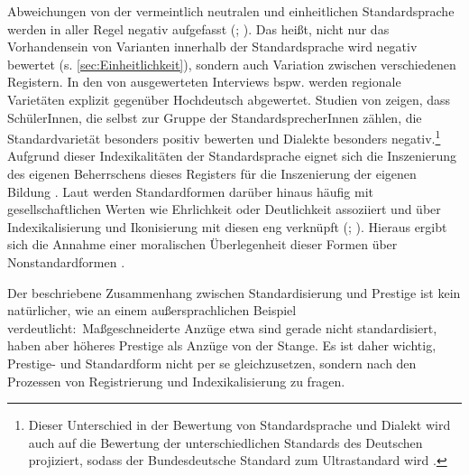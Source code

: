 Abweichungen von der vermeintlich neutralen und einheitlichen Standardsprache werden in aller Regel negativ aufgefasst (\citealp[s.][522]{Harnisch.2005}; \citealp[136]{Silverstein.2017}).
Das heißt, nicht nur das Vorhandensein von Varianten innerhalb der Standardsprache wird negativ bewertet (s. \autoref{sec:Einheitlichkeit}), sondern auch Variation zwischen verschiedenen Registern.  
In den von \citet[]{Beuge2017} ausgewerteten Interviews bspw. werden regionale Varietäten explizit gegenüber \glqq Hochdeutsch\grqq{} abgewertet. 
Studien von \citet{Schmid.1973} zeigen, dass Sch{\"u}lerInnen, die selbst zur Gruppe der StandardsprecherInnen z{\"a}hlen, die Standardvariet{\"a}t besonders positiv bewerten und Dialekte besonders negativ.\footnote{Dieser Unterschied in der Bewertung von Standardsprache und Dialekt wird auch auf die Bewertung der unterschiedlichen Standards des Deutschen projiziert, sodass der Bundesdeutsche Standard zum {\glqq}Ultrastandard{\grqq} wird \citep[s.][32]{Auer.2013}.} 
Aufgrund dieser Indexikalitäten der Standardsprache eignet sich die Inszenierung des eigenen Beherrschens dieses Registers für die Inszenierung der eigenen Bildung \citep[s.][108]{Arendt2015}. 
Laut \citet[64]{Woolard1994} werden Standardformen darüber hinaus häufig mit gesellschaftlichen Werten wie Ehrlichkeit oder Deutlichkeit assoziiert und über Indexikalisierung und Ikonisierung mit diesen eng verknüpft (\citealp[s.][239]{Silverstein.1985}; \citeyear[141]{Silverstein.2017}). 
Hieraus ergibt sich die Annahme einer moralischen Überlegenheit dieser Formen über Nonstandardformen \citep[s.][21]{Woolard1998}. 

Der beschriebene Zusammenhang zwischen Standardisierung und Prestige ist kein natürlicher, wie \citet[532--533]{Milroy2001} an einem au{\ss}ersprachlichen Beispiel verdeutlicht:~Ma{\ss}geschneiderte Anz{\"u}ge etwa sind gerade nicht standardisiert, haben aber h{\"o}heres Prestige als Anz{\"u}ge {\glqq}von der Stange{\grqq}. 
Es ist daher wichtig, Prestige- und Standardform nicht per se gleichzusetzen, sondern nach den Prozessen von Registrierung und Indexikalisierung zu fragen.

